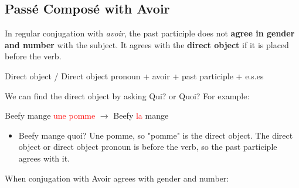 \documentclass{book}
\begin{document}
\subsection{Passé Composé with Avoir}
In regular conjugation with \textit{avoir}, the past participle does not \textbf{agree in gender and number} with the subject. It agrees with the \textbf{direct object} if it is placed before the verb. 
\begin{center}
    Direct object / Direct object pronoun + avoir + past participle + e.s.es
\end{center}
We can find the direct object by asking Qui? or Quoi? For example:
\begin{center}
    Beefy mange \textcolor{red}{une pomme} $\to$ Beefy \textcolor{red}{la} mange
\end{center}
\begin{itemize}
    \item Beefy mange quoi? Une pomme, so "pomme" is the direct object. The direct object or direct object pronoun is before the verb, so the past participle agrees with it.
\end{itemize}
When conjugation with Avoir agrees with gender and number:
\end{document}
